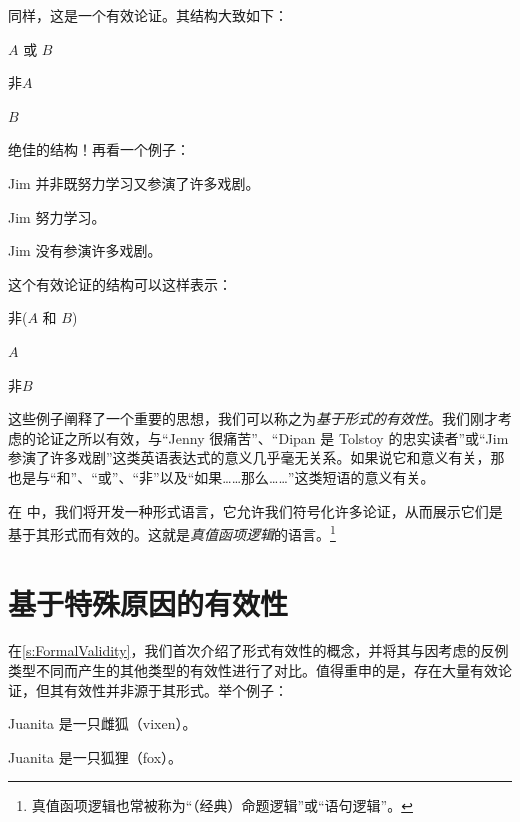 同样，这是一个有效论证。其结构大致如下：


\begin{earg}
		\item[] $A$ 或 $B$
		\item[] 非$A$
		\item[\texttherefore] $B$
	\end{earg}


绝佳的结构！再看一个例子：


\begin{earg}
		\item[] Jim 并非既努力学习又参演了许多戏剧。
		\item[] Jim 努力学习。
		\item[\texttherefore] Jim 没有参演许多戏剧。
	\end{earg}


这个有效论证的结构可以这样表示：


\begin{earg}
		\item[] 非($A$ 和 $B$)
		\item[] $A$
		\item[\texttherefore] 非$B$
	\end{earg}


这些例子阐释了一个重要的思想，我们可以称之为\emph{基于形式的有效性}。我们刚才考虑的论证之所以有效，与“Jenny 很痛苦”、“Dipan 是 Tolstoy 的忠实读者”或“Jim 参演了许多戏剧”这类英语表达式的意义几乎毫无关系。如果说它和意义有关，那也是与“和”、“或”、“非”以及“如果……那么……”这类短语的意义有关。

在 中，我们将开发一种形式语言，它允许我们符号化许多论证，从而展示它们是基于其形式而有效的。这就是\emph{真值函项逻辑}的语言。\footnote{真值函项逻辑也常被称为“（经典）命题逻辑”或“语句逻辑”。}

\section{基于特殊原因的有效性}

在\cref{s:FormalValidity}，我们首次介绍了形式有效性的概念，并将其与因考虑的反例类型不同而产生的其他类型的有效性进行了对比。值得重申的是，存在大量有效论证，但其有效性并非源于其形式。举个例子：


\begin{earg}
		\item[] Juanita 是一只雌狐（vixen）。
		\item[\texttherefore] Juanita 是一只狐狸（fox）。
	\end{earg}


